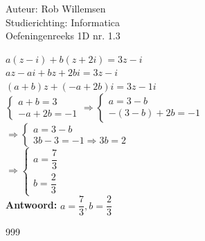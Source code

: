 \documentclass[a4paper]{article}
\begin{document}
\noindent \large Auteur: Rob Willemsen \\
\noindent \large Studierichting: Informatica\\
\noindent \large Oefeningenreeks 1D nr. 1.3\\

\medskip
\normalsize

$a(z-i) + b(z+2i) = 3z - i$ \\

$az - ai + bz + 2bi = 3z - i$ \\

$(a+b)z + (-a+2b)i = 3z - 1i$ \\

$\left\{
    \begin{array}{l}
        a + b = 3 \\
        -a + 2b = -1 
    \end{array}
  \right.
  \Rightarrow
  \left\{
    \begin{array}{l}
        a = 3 - b \\
        -(3 - b) + 2b = -1 
    \end{array}
  \right.$ \\

$\Rightarrow
  \left\{
    \begin{array}{l}
        a = 3 - b \\
        3b - 3 = -1 \Rightarrow 3b = 2 
    \end{array}
  \right.$ \\

$\Rightarrow
  \left\{
    \begin{array}{l}
        a = \dfrac{7}{3} \\
        b = \dfrac{2}{3} 
    \end{array}
  \right.$ \\

\textbf{Antwoord:} $a = \dfrac{7}{3}, b = \dfrac{2}{3}$ \\

\begin{thebibliography}{999}
\end{thebibliography}
\end{document}

